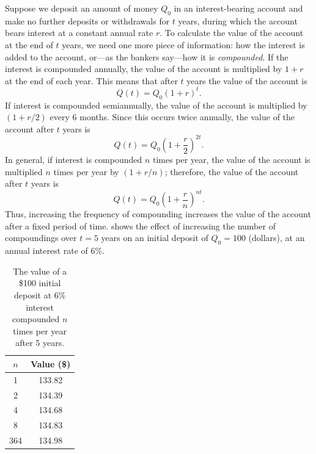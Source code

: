 
Suppose we deposit an amount of money $Q_0$  in an
interest-bearing account and make no further deposits or withdrawals
for $t$ years, during which the account bears interest at a constant
annual rate $r$. To calculate the value of the account at the
end of $t$ years, we need one more piece of information: how the
interest is added to the account, or---as the bankers say---how it
is \emph{\color{blue}compounded}. If the interest is compounded annually,  the
value of the account is multiplied by $1+r$ at the end of each year.
This means that after $t$ years the value of the account is
\[
Q(t)=Q_0(1+r)^t.
\]
If interest is compounded semiannually,  the
value of the account is multiplied by $(1+r/2)$ every 6 months.
Since this occurs twice annually, the value of the account after $t$
years is
\[
Q(t)=Q_0\left(1+\frac{r}{2}\right)^{2t}.
\]
In general, if interest is compounded $n$ times per year, the value of
the account is multiplied $n$ times per year by $(1+r/n)$;  therefore,
the value of the account
after $t$ years is
\begin{equation} \label{eq:4.1.8}
Q(t)=Q_0\left(1+\frac{r}{n}\right)^{nt}.
\end{equation}
Thus, increasing the frequency of compounding increases the value of the
account after a fixed period of time.  shows the
effect
of increasing the number of compoundings over $t=5$ years on an initial
deposit of $Q_0=100$ (dollars), at an annual interest rate of 6\%.

\begin{table}
\caption{The value of a \$100 initial deposit at 6\% interest compounded $n$ times per year after 5 years.}
\label{table:4.1.1}
\centering
{}
\begin{tabular}{S[table-format=3]c}\toprule
$n$ & Value (\$)\\ & 133.82 \\
2 & 134.39 \\
4 & 134.68 \\
8 & 134.83 \\
364 & 134.98 \\\bottomrule
\end{tabular}
\end{table}

